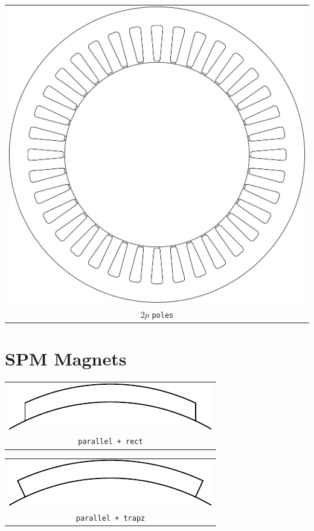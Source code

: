 \documentclass[a4paper,11pt,oneside,fleqn,titlepage]{report}
\begin{document}
\begin{tabular}{c}
\includegraphics[scale=0.75]{../examples/stators/2ppole}
 
\\
$ 2p $ \texttt{poles}
\end{tabular}



\newpage
\section{SPM Magnets}

\begin{tabular}{c}
\includegraphics[scale=1]{../examples/magnets/parallel_rect}
\\
\texttt{parallel + rect}
\end{tabular}
\vspace{5mm}

\noindent
\begin{tabular}{c}
\includegraphics[scale=1]{../examples/magnets/parallel_trapz}
\\
\texttt{parallel + trapz}
\end{tabular}
\vspace{5mm}
\end{document}
